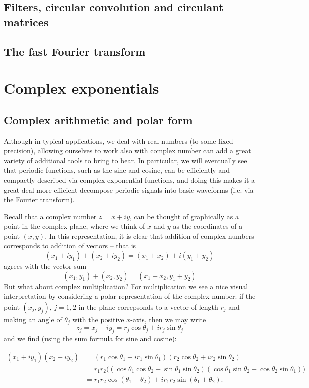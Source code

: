\documentclass[12pt]{report}
\theoremstyle{plain}
\begin{document}
 
\section{Filters, circular convolution and circulant matrices}

\section{The fast Fourier transform}

\appendix

\chapter{Complex exponentials}

\section{Complex arithmetic and polar form}

Although in typical applications, we deal with real numbers (to some fixed precision), allowing ourselves to work also with complex number can add a great variety of additional tools to bring to bear. In particular, we will eventually see that periodic functions, such as the sine and cosine, can be efficiently and compactly described via complex exponential functions, and doing this makes it a great deal more efficient decompose periodic signals into basic waveforms (i.e. via the Fourier transform).

Recall that a complex number $z = x + iy$, can be thought of graphically as a point in the complex plane, where we think of $x$ and $y$ as the coordinates of a point $(x, y)$. In this representation, it is clear that addition of complex numbers corresponds to addition of vectors -- that is
\[ (x_1 + i y_1) + (x_2 + i y_2) = (x_1 + x_2) + i (y_1 + y_2)\]
agrees with the vector sum
\[ (x_1, y_1) + (x_2, y_2) = (x_1 + x_2, y_1 + y_2) \]
But what about complex multiplication? For multiplication we see a nice visual interpretation by considering a polar representation of the complex number: if the point $(x_j, y_j)$, $j = 1, 2$ in the plane correpsonds to a vector of length $r_j$ and making an angle of $\theta_j$ with the positive $x$-axis, then we may write
\[z_j = x_j + i y_j = r_j \cos \theta_j + i r_j \sin \theta_j \]
and we find (using the sum formula for sine and cosine):

\begin{align} \label{angles add}
(x_1 + i y_1)(x_2 + i y_2) &= (r_1 \cos \theta_1 + i r_1 \sin \theta_1)(r_2 \cos \theta_2 + i r_2 \sin \theta_2) \\ &= r_1 r_2 \Big( (\cos \theta_1 \cos \theta_2 - \sin \theta_1 \sin \theta_2) (\cos \theta_1 \sin \theta_2 + \cos \theta_2 \sin \theta_1 )\Big) \\ &= r_1 r_2 \cos (\theta_1 + \theta_2) + i r_1 r_2 \sin (\theta_1 + \theta_2).
\end{align}
\end{document}
